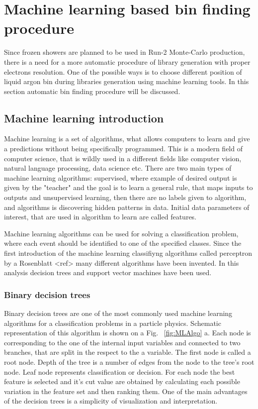 \section{Machine learning based bin finding procedure}

Since frozen showers are planned to be used in Run-2 Monte-Carlo production, there is a need for a more automatic procedure of library generation with proper electrons resolution. One of the possible ways is to choose different position of liquid argon bin during libraries generation using machine learning tools. In this section automatic bin finding procedure will be discussed.
\subsection{Machine learning introduction} 

Machine learning is a set of algorithms, what allows computers to learn and give a predictions without being specifically programmed. This is a modern field of computer science, that is wildly used in a different fields like computer vision, natural language processing, data science etc. There are two main types of machine learning algorithms: supervised, where example of desired output is given by the "teacher" and the goal is to learn a general rule, that maps inputs to outputs and unsupervised learning, then there are no labels given to algorithm, and algorithms is discovering hidden patterns in data. Initial data parameters of interest, that are used in algorithm to learn are called features. 

Machine learning algorithms can be used for solving a classification problem, where each event should be identified to one of the specified classes. Since the first introduction of the machine learning classifiyng algorithms called perceptron by a Rosenblatt <ref> many different algorithms have been invented. In this analysis decision trees and support vector machines have been used.

\subsubsection{Binary decision trees}

Binary decision trees are one of the most commonly used machine learning algorithms for a classification problems in a particle physics. Schematic representation of this algorithm is shown on a Fig. ~\ref{fig:MLAlgo} a. Each node is corresponding to the one of the internal input variables and connected to two branches, that are split in the respect to the a variable. The first node is called a root node. Depth of the tree is a number of edges from the node to the tree's root node. Leaf node represents classification or decision.
 For each node the best feature is selected and it's cut value are obtained by calculating each possible variation in the feature set and then ranking them. One of the main advantages of the decision trees is a simplicity of visualization and interpretation. 

